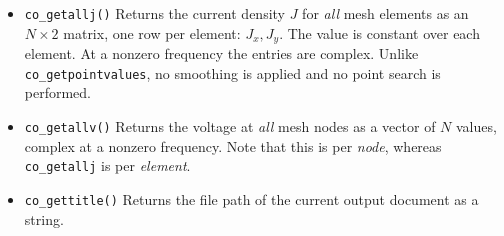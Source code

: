 \begin{itemize}
\item{\tt co\_getallj()} Returns the current density $J$ for {\em all} mesh
elements as an $N \times 2$ matrix, one row per element: $J_x, J_y$.  The value
is constant over each element.  At a nonzero frequency the entries are complex.
Unlike {\tt co\_getpointvalues}, no smoothing is applied and no point search is
performed.

\item{\tt co\_getallv()} Returns the voltage at {\em all} mesh nodes as a vector
of $N$ values, complex at a nonzero frequency.  Note that this is per {\em
node}, whereas {\tt co\_getallj} is per {\em element}.


\item{\tt co\_gettitle()} Returns the file path of the current output document as a string.

\end{itemize}


